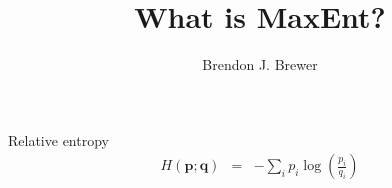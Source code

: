 \documentclass[letterpaper, 11pt]{article}
\title{What is MaxEnt?}
\author{Brendon J. Brewer}
\begin{document}
\maketitle

Relative entropy
\begin{eqnarray}
H(\mathbf{p}; \mathbf{q}) &=& -\sum_i p_i \log\left(\frac{p_i}{q_i}\right) 
\end{eqnarray}

\begin{thebibliography}{}
\end{thebibliography}
\end{document}
